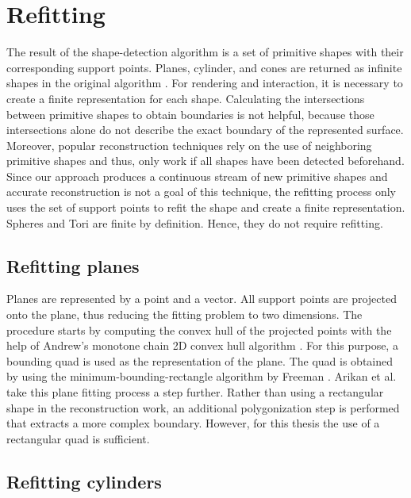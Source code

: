 \section{Refitting}
\label{sec:Refitting}

The result of the shape-detection algorithm is a set of primitive shapes with their corresponding support points. Planes, cylinder, and cones are returned as infinite shapes in the original algorithm \cite{schnabel-2007-efficient}. For rendering and interaction, it is necessary to create a finite representation for each shape. Calculating the intersections between primitive shapes to obtain boundaries is not helpful, because those intersections alone do not describe the exact boundary of the represented surface. Moreover, popular reconstruction techniques \cite{jenke2008surface, schnabel-2009-completion} rely on the use of neighboring primitive shapes and thus, only work if all shapes have been detected beforehand. Since our approach produces a continuous stream of new primitive shapes and accurate reconstruction is not a goal of this technique, the refitting process only uses the set of support points to refit the shape and create a finite representation. Spheres and Tori are finite by definition. Hence, they do not require refitting. 


\subsection{Refitting planes}

Planes are represented by a point and a vector. All support points are projected onto the plane, thus reducing the fitting problem to two dimensions. The procedure starts by computing the convex hull of the projected points with the help of Andrew's monotone chain 2D convex hull algorithm \cite{andrew1979another}. 
For this purpose, a bounding quad is used as the representation of the plane. The quad is obtained by using the minimum-bounding-rectangle algorithm by Freeman \cite{freeman1975determining}. Arikan et al. \cite{arikan-2013-osn} take this plane fitting process a step further. Rather than using a rectangular shape in the reconstruction work, an additional polygonization step is performed that extracts a more complex boundary. However, for this thesis the use of a rectangular quad is sufficient.  


\subsection{Refitting cylinders}

